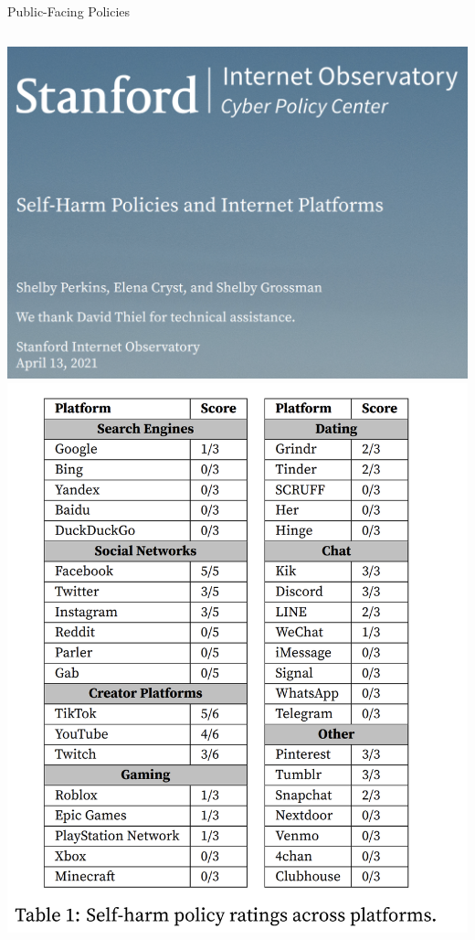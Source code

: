 \documentclass[nobackground,dvipsnames,table]{beamer}
\begin{document}
\begin{frame}{Public-Facing Policies}
    \begin{columns}
            \includegraphics[width=\textwidth]{sio-self-harm-policies-report}
            \includegraphics[width=\textwidth]{sio-self-harm-policies-table}
    \end{columns}
\end{frame}
\end{document}

